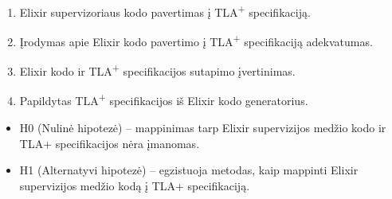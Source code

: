 \documentclass{VUMIFPSmagistrinis}
\begin{document}
		\begin{enumerate}
			\item{Elixir supervizoriaus kodo pavertimas į TLA\textsuperscript{+} specifikaciją.}
			\item{Įrodymas apie Elixir kodo pavertimo į TLA\textsuperscript{+} specifikaciją adekvatumas.}
			\item{Elixir kodo ir TLA\textsuperscript{+} specifikacijos sutapimo įvertinimas.}
			\item{Papildytas TLA\textsuperscript{+} specifikacijos iš Elixir kodo generatorius.}
		\end{enumerate}

		\begin{itemize}
			\item H0 (Nulinė hipotezė) -- mappinimas tarp Elixir supervizijos medžio kodo ir TLA+ specifikacijos nėra įmanomas.
			\item H1 (Alternatyvi hipotezė) -- egzistuoja metodas, kaip mappinti Elixir supervizijos medžio kodą į TLA+ specifikaciją. 
		\end{itemize}
		
	\pagebreak
	\printbibliography[heading=bibintoc] 
\end{document}
